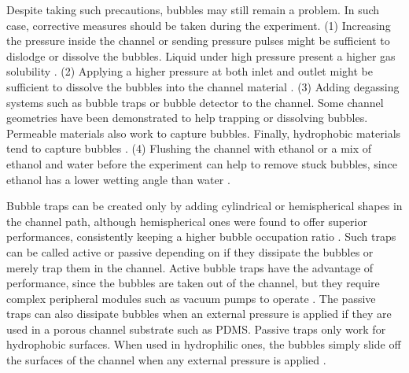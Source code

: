 Despite taking such precautions, bubbles may still remain a problem. In such case, corrective measures should be taken during the experiment. (1) Increasing the pressure inside the channel or sending pressure pulses might be sufficient to dislodge or dissolve the bubbles. Liquid under high pressure present a higher gas solubility \cite{AirBubbles,Ufluidix,bruus2011theoretical}. (2) Applying a higher pressure at both inlet and outlet might be sufficient to dissolve the bubbles into the channel material \cite{AirBubbles,Ufluidix}. (3) Adding degassing systems such as bubble traps or bubble detector to the channel. Some channel geometries have been demonstrated to help trapping or dissolving bubbles. Permeable materials also work to capture bubbles. Finally, hydrophobic materials tend to capture bubbles \cite{AirBubbles,Ufluidix,Olanrewaju2018,bruus2011theoretical,Kang2010}. (4) Flushing the channel with ethanol or a mix of ethanol and water before the experiment can help to remove stuck bubbles, since ethanol has a lower wetting angle than water \cite{Ufluidix}. \par

Bubble traps can be created only by adding cylindrical or hemispherical shapes in the channel path, although hemispherical ones were found to offer superior performances, consistently keeping a higher bubble occupation ratio \cite{Kang2010}. Such traps can be called active or passive depending on if they dissipate the bubbles or merely trap them in the channel. Active bubble traps have the advantage of performance, since the bubbles are taken out of the channel, but they require complex peripheral modules such as vacuum pumps to operate \cite{AirBubbles,Ufluidix,Kang2010}. The passive traps can also dissipate bubbles when an external pressure is applied if they are used in a porous channel substrate such as PDMS. Passive traps only work for hydrophobic surfaces. When used in hydrophilic ones, the bubbles simply slide off the surfaces of the channel when any external pressure is applied \cite{Kang2010}.